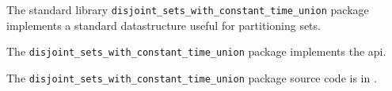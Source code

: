 
The standard library {\tt disjoint\_sets\_with\_constant\_time\_union} package implements 
a standard datastructure useful for partitioning sets.

The {\tt disjoint\_sets\_with\_constant\_time\_union} package implements the  api.

The {\tt disjoint\_sets\_with\_constant\_time\_union} package source code is in .

